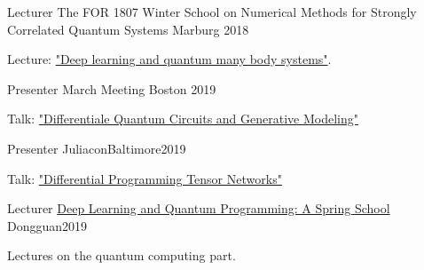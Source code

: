 \documentclass[11pt, a4paper]{awesome-cv}
\begin{document}
%
\begin{cventries}
    \cventry
    {Lecturer}
    {The FOR 1807 Winter School on Numerical Methods for Strongly Correlated Quantum Systems}
    {Marburg}
    {2018}
    {
    \begin{cvitems}
        Lecture: \href{https://github.com/GiggleLiu/marburg}{"Deep learning and quantum many body systems"}.
    \end{cvitems}
    }
\cventry
    {Presenter} %
    {March Meeting} %
    {Boston} %
    {2019} %
    {
    \begin{cvitems}
        Talk: \href{https://meetings.aps.org/Meeting/MAR19/Session/E27.10}{"Differentiale Quantum Circuits and Generative Modeling"}
    \end{cvitems}
    }
\cventry
    {Presenter}
    {Juliacon}{Baltimore}{2019}
    {
    \begin{cvitems}
        Talk: \href{https://www.youtube.com/watch?v=f-CaQMTqjPk}{"Differential Programming Tensor Networks"}
    \end{cvitems}
    }
\cventry
    {Lecturer}
    {\href{https://github.com/QuantumBFS/SSSS}{Deep Learning and Quantum Programming: A Spring School}}
    {Dongguan}{2019}
    {
    \begin{cvitems}
        Lectures on the quantum computing part.
    \end{cvitems}
    }

\end{cventries}
\end{document}
